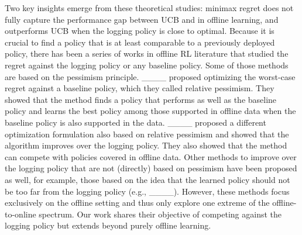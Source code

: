 Two key insights emerge from these theoretical studies:
minimax regret does not fully capture the performance gap between UCB and \alglcb in offline learning, and \alglcb outperforms UCB when the logging policy is close to optimal. 
Because it is crucial to find a policy that is at least comparable to a previously deployed policy, there has been a series of works in offline RL literature that studied the regret against the logging policy or any baseline policy. Some of those methods are based on the pessimism principle. ____ proposed optimizing the worst-case regret against a baseline policy, which they called relative pessimism. They showed that the method finds a policy that performs as well as the baseline policy and learns the best policy among those supported in offline data when the baseline policy is also supported in the data. ____ proposed a different optimization formulation also based on relative pessimism and showed that the algorithm improves over the logging policy. They also showed that the method can compete with policies covered in offline data. Other methods to improve over the logging policy that are not (directly) based on pessimism have been proposed as well, for example, those based on the idea that the learned policy should not be too far from the logging policy (e.g., ____). However, these methods focus exclusively on the offline setting and thus only explore one extreme of the offline-to-online spectrum. Our work shares their objective of competing against the logging policy but extends beyond purely offline learning.  

